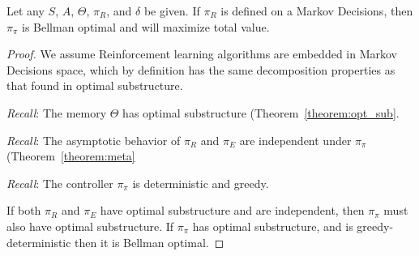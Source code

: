 \begin{theorem} \label{theorem:meta_total} 
    \label{theorem:meta} 
	 Let any $S$, $A$, $\Theta$, $\pi_R$, and $\delta$ be given. If $\pi_R$ is defined on a Markov Decisions, then $\pi_\pi$ is Bellman optimal and will maximize total value. 
\end{theorem}
\begin{proof}
    We assume Reinforcement learning algorithms are embedded in Markov Decisions space, which by definition has the same decomposition properties as that found in optimal substructure.
    
    \textit{Recall}: The memory $\Theta$ has optimal substructure (Theorem~\ref{theorem:opt_sub}.
    
	\textit{Recall}: The asymptotic behavior of $\pi_R$ and $\pi_E$ are independent under $\pi_\pi$ (Theorem~\ref{theorem:meta}
	
	\textit{Recall}: The controller $\pi_\pi$ is deterministic and greedy.
	
	If both $\pi_R$ and $\pi_E$ have optimal substructure and are independent, then $\pi_\pi$ must also have optimal substructure. If $\pi_\pi$ has optimal substructure, and is greedy-deterministic then it is Bellman optimal.
\end{proof}
